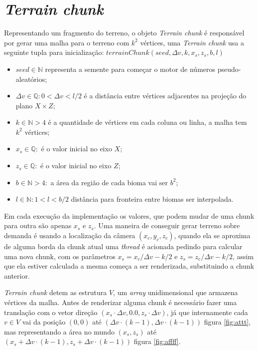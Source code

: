 \section{\textit{Terrain chunk}}
Representando um fragmento do terreno, o objeto \textit{Terrain chunk} é responsável
por gerar uma malha para o terreno com $k^2$ vértices, uma \textit{Terrain chunk} usa
a seguinte tupla para inicialização: 
$terrainChunk(seed, \Delta{v}, k, x_{s}, z_{s}, b, l)$
\begin{itemize}
    \item $seed \in \mathbb{N}$ representa a semente para começar o motor de números
    pseudo-aleatórios;
    \item $\Delta{v} \in \mathbb{Q}:0 < \Delta{v} < l/2$ é a distância entre vértices adjacentes na
    projeção do plano $X \times Z$;
    \item $k \in \mathbb{N}>4$ é a quantidade de vértices em cada coluna ou 
    linha, a malha tem $k^2$ vértices;
    \item $x_{s} \in \mathbb{Q}:$ é o valor inicial no eixo $X$;
    \item $z_{s} \in \mathbb{Q}:$ é o valor inicial no eixo $Z$;
    \item $b \in \mathbb{N}>4:$ a área da região de cada bioma vai ser $b^2$;
    \item $l \in \mathbb{N}:1 < l < b/2$ distância para fronteira entre biomas ser interpolada.
\end{itemize}


Em cada execução da implementação os valores, que podem mudar de uma chunk para 
outra são apenas $x_{s}$ e $z_{s}$. Uma maneira de conseguir gerar terreno sobre demanda
é usando a localização da câmera $(x_{c}, y_{c}, z_{c})$, quando ela se
aproxima de alguma borda da chunk atual
uma \textit{thread} é acionada pedindo para calcular uma nova chunk, com os parâmetros
$x_{s} = x_{c}/\Delta{v} - k/2$ e $z_{s} = z_{c}/\Delta{v} - k/2$, assim que ela
estiver calculada a mesma começa a ser renderizada, substituindo a chunk anterior.

\textit{Terrain chunk} detem as estrutura $V$, um \textit{array} unidimensional que armazena
vértices da malha.
Antes de renderizar alguma chunk é necessário fazer uma translação com o vetor direção 
$(x_{s} \cdot \Delta{v}, 0.0, z_{s} \cdot \Delta{v})$, já que internamente cada $v \in V$ vai 
da posição $(0, 0)$ até $(\Delta{v} \cdot (k-1), \Delta{v} \cdot (k-1))$ figura \ref{fig:attt}, mas representando a área 
no mundo $(x_{s}, z_{s})$ até $(x_{s} + \Delta{v} \cdot (k-1), z_{s} + \Delta{v} \cdot (k-1))$ figura \ref{fig:affff}.

